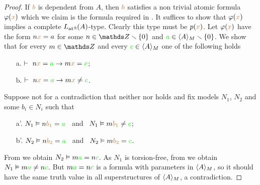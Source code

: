 \documentclass[creche.tex]{subfiles}
\begin{document}
\begin{proof}
If ${\color{brown} b}$ is dependent from $A$, then ${\color{brown} b}$ satisfies a non trivial atomic formula $\varphi({\color{brown} x})$ which we claim is the formula required in . It suffices to show that $\varphi({\color{brown} x})$ implies a complete $L_{{\tiny\rm at^\pm}}\hskip-.3ex(A)$-type. Clearly this type must be $p({\color{brown} x})$. Let $\varphi({\color{brown} x})$ have the form $n{\color{brown} x}=a$ for some $n\in\ZZ\sm\{0\}$ and ${\color{green} a}\in\langle A\rangle_M\smallsetminus\{0\}$. We show that for every $m\in\ZZ$ and every ${\color{green} c}\in\langle A\rangle_M$ one of the following holds
\begin{itemize}
\item[a.] $\vdash\   n{\color{brown} x}={\color{green} a}\rightarrow m{\color{brown} x}={\color{green} c}$;
\item[b.] $\vdash\   n{\color{brown} x}={\color{green} a}\rightarrow m{\color{brown} x}\neq {\color{green}c}$.
\end{itemize} 
Suppose not for a contradiction that neither  nor  holds and fix models $N_1$, $N_2$ and some $b_i\in N_i$ such that
\begin{itemize}
\item[a'.] $N_1\vDash n{\color{brown} b_1}={\color{green} a}$ \ and \ $N_1\vDash m{\color{brown} b_1}\neq {\color{green}c}$;
\item[b'.] $N_2\vDash n{\color{brown} b_2}={\color{green} a}$ \ and \ $N_2\vDash m{\color{brown} b_2} = {\color{green} c}$.
\end{itemize} 
From  we obtain $N_2\vDash m{\color{green} a}=n{\color{green} c}$. As $N_1$ is torsion-free, from  we obtain $N_1\vDash m{\color{green} a}\neq n{\color{green} c}$. But $m{\color{green} a}=n{\color{green} c}$ is a formula with parameters in $\langle A\rangle_M$, so it should have the same truth value in all superstructures of $\langle A\rangle_M$, a contradiction.
\end{proof}






% 
% 
% 
\end{document}

